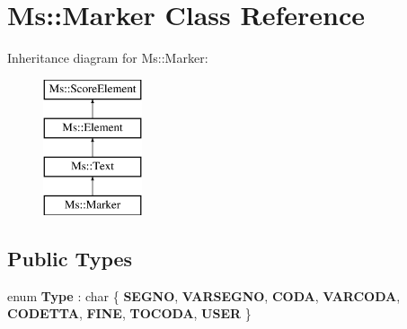 \hypertarget{class_ms_1_1_marker}{}\section{Ms\+:\+:Marker Class Reference}
\label{class_ms_1_1_marker}
Inheritance diagram for Ms\+:\+:Marker\+:\begin{figure}[H]
\begin{center}
\leavevmode
\includegraphics[height=4.000000cm]{class_ms_1_1_marker}
\end{center}
\end{figure}
\subsection*{Public Types}
\begin{DoxyCompactItemize}
\item 
\mbox{\label{class_ms_1_1_marker_a8f973ab66eaa0a1dcc0adb1e187e60f0}} 
enum {\bfseries Type} \+: char \{ \newline
{\bfseries S\+E\+G\+NO}, 
{\bfseries V\+A\+R\+S\+E\+G\+NO}, 
{\bfseries C\+O\+DA}, 
{\bfseries V\+A\+R\+C\+O\+DA}, 
\newline
{\bfseries C\+O\+D\+E\+T\+TA}, 
{\bfseries F\+I\+NE}, 
{\bfseries T\+O\+C\+O\+DA}, 
{\bfseries U\+S\+ER}
 \}
\end{DoxyCompactItemize}
